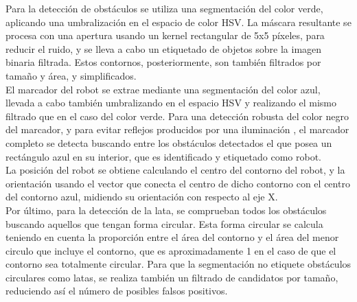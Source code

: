 Para la detección de obstáculos se utiliza una segmentación del color verde, aplicando una umbralización en el espacio de color HSV. La máscara resultante se procesa con una apertura usando un kernel rectangular de 5x5 píxeles, para reducir el ruido, y se lleva a cabo un etiquetado de objetos sobre la imagen binaria filtrada. Estos contornos, posteriormente, son también filtrados por tamaño y área, y simplificados.\\

El marcador del robot se extrae mediante una segmentación del color azul, llevada a cabo también umbralizando en el espacio HSV y realizando el mismo filtrado que en el caso del color verde. Para una detección robusta del color negro del marcador, y para evitar reflejos producidos por una iluminación , el marcador completo se detecta buscando entre los obstáculos detectados el que posea un rectángulo azul en su interior, que es identificado y etiquetado como robot.\\ 

La posición del robot se obtiene calculando el centro del contorno del robot, y la orientación usando el vector que conecta el centro de dicho contorno con el centro del contorno azul, midiendo su orientación con respecto al eje X.\\

Por último, para la detección de la lata, se comprueban todos los obstáculos buscando aquellos que tengan forma circular. Esta forma circular se calcula teniendo en cuenta la proporción entre el área del contorno y el área del menor circulo que incluye el contorno, que es aproximadamente 1 en el caso de que el contorno sea totalmente circular. Para que la segmentación no etiquete obstáculos circulares como latas, se realiza también un filtrado de candidatos por tamaño, reduciendo así el número de posibles falsos positivos.\\